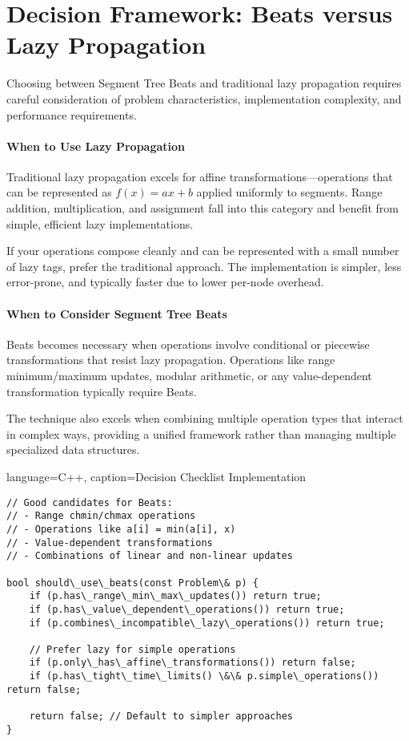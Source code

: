 \section{Decision Framework: Beats versus Lazy Propagation}
\label{sec:beats_vs_lazy}

Choosing between Segment Tree Beats and traditional lazy propagation requires careful consideration of problem characteristics, implementation complexity, and performance requirements.

\paragraph{When to Use Lazy Propagation}

Traditional lazy propagation excels for affine transformations—operations that can be represented as $f(x) = ax + b$ applied uniformly to segments. Range addition, multiplication, and assignment fall into this category and benefit from simple, efficient lazy implementations.

If your operations compose cleanly and can be represented with a small number of lazy tags, prefer the traditional approach. The implementation is simpler, less error-prone, and typically faster due to lower per-node overhead.

\paragraph{When to Consider Segment Tree Beats}

Beats becomes necessary when operations involve conditional or piecewise transformations that resist lazy propagation. Operations like range minimum/maximum updates, modular arithmetic, or any value-dependent transformation typically require Beats.

The technique also excels when combining multiple operation types that interact in complex ways, providing a unified framework rather than managing multiple specialized data structures.

\begin{marginlisting}[0pt]{language=C++, caption=Decision Checklist Implementation}
\begin{lstlisting}
// Good candidates for Beats:
// - Range chmin/chmax operations
// - Operations like a[i] = min(a[i], x)
// - Value-dependent transformations
// - Combinations of linear and non-linear updates

bool should\_use\_beats(const Problem\& p) {
    if (p.has\_range\_min\_max\_updates()) return true;
    if (p.has\_value\_dependent\_operations()) return true;
    if (p.combines\_incompatible\_lazy\_operations()) return true;
    
    // Prefer lazy for simple operations
    if (p.only\_has\_affine\_transformations()) return false;
    if (p.has\_tight\_time\_limits() \&\& p.simple\_operations()) return false;
    
    return false; // Default to simpler approaches
}
\end{lstlisting}
\end{marginlisting}

